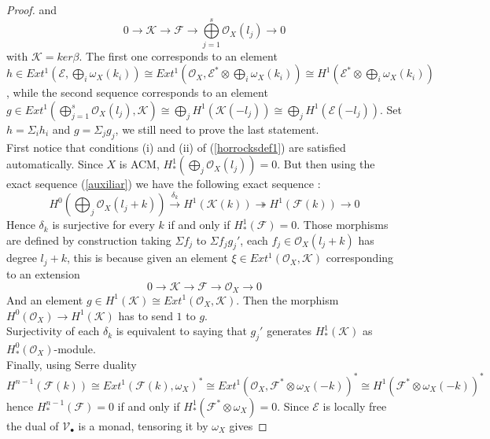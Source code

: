 \documentclass[
	oldfontcommands,
	sumario=abnt-6027-2012,
	12pt,			%
	openright,		%
	oneside,		%
	a4paper,		%
	english,		%
	brazil			%
	]{imecc-unicamp}
\begin{document}
\begin{proof}
and
\begin{equation}\label{auxiliar}
0 \to \mathcal{K} \to \mathcal{F} \to \bigoplus\limits_{j=1}^s \mathcal{O}_X (l_j) \to 0
\end{equation}
with $\mathcal{K} = ker \beta$. The first one corresponds to an element $h \in Ext^1(\mathcal{E}, \bigoplus_i \omega_X (k_i) ) \cong Ext^1 (\mathcal{O}_X,\mathcal{E}^* \otimes \bigoplus_i \omega_X (k_i)) \cong H^1(\mathcal{E}^* \otimes \bigoplus_i \omega_X (k_i) )$, while the second sequence corresponds to an element $g \in Ext^1(\bigoplus\limits_{j=1}^s \mathcal{O}_X (l_j),\mathcal{K}) \cong \bigoplus_j H^1( \mathcal{K}(-l_j)) \cong \bigoplus_j H^1(\mathcal{E}(-l_j))$. Set $h = \Sigma_i h_i$ and $g = \Sigma_j g_j$, we still need to prove the last statement. \\
First notice that conditions (i) and (ii) of (\ref{horrocksdef1}) are satisfied automatically.
Since $X$ is ACM, $H^{1}_* (\bigoplus_j \mathcal{O}_X (l_j))=0$. But then using the exact sequence (\ref{auxiliar}) we have the following exact sequence :
\begin{equation}
H^0(\bigoplus_j \mathcal{O}_X (l_j +k)) \overset{\delta_k}{\to} H^1(\mathcal{K}(k)) \twoheadrightarrow H^1 (\mathcal{F}(k)) \to 0
\end{equation} 
Hence $\delta_k$ is surjective for every $k$ if and only if $H^{1}_* (\mathcal{F})=0$.
Those morphisms are defined by construction taking $\Sigma f_j$ to $\Sigma  f_j g_j'$, each $f_j\in \mathcal{O}_X (l_j +k)$ has degree $l_j+k$, this is because given an element $\xi \in Ext^1(\mathcal{O}_X,\mathcal{K})$ corresponding to an extension 
\begin{equation}
0 \to \mathcal{K} \to \mathcal{F} \to \mathcal{O}_X \to 0
\end{equation}
And an element $g \in H^1(\mathcal{K}) \cong Ext^1(\mathcal{O}_X,\mathcal{K})$. 
Then the morphism $H^0(\mathcal{O}_X) \to H^1(\mathcal{K})$ has to send $1$ to $g$.\\
Surjectivity of each $\delta_k$ is equivalent to saying that $g_j'$ generates $H^1_*(\mathcal{K})$ as $H^0_*(\mathcal{O}_X)$-module. \\
Finally, using Serre duality $H^{n-1}(\mathcal{F}(k)) \cong Ext^1(\mathcal{F}(k),\omega_X)^* \cong Ext^1(\mathcal{O}_X,\mathcal{F}^* \otimes \omega_X (-k))^* \cong H^1(\mathcal{F}^* \otimes \omega_X (-k))^*$ hence $H^{n-1}_*(\mathcal{F})=0$ if and only if $H^1_*(\mathcal{F}^* \otimes \omega_X)=0$.
Since $\mathcal{E}$ is locally free the dual of $\mathcal{V}_\bullet$ is a monad, tensoring it by $\omega_X$ gives

\end{proof}
\end{document}

